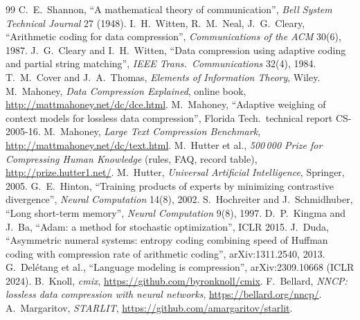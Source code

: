 \documentclass[11pt,a4paper,openany]{book}
\theoremstyle{definition}
\theoremstyle{remark}
\begin{document}
\begin{thebibliography}{99}
 C.~E.~Shannon, ``A mathematical theory of communication'', \emph{Bell System Technical Journal} 27 (1948).
 I.~H.~Witten, R.~M.~Neal, J.~G.~Cleary, ``Arithmetic coding for data compression'', \emph{Communications of the ACM} 30(6), 1987.
 J.~G.~Cleary and I.~H.~Witten, ``Data compression using adaptive coding and partial string matching'', \emph{IEEE Trans.\ Communications} 32(4), 1984.
 T.~M.~Cover and J.~A.~Thomas, \emph{Elements of Information Theory}, Wiley.
 M.~Mahoney, \emph{Data Compression Explained}, online book, \url{http://mattmahoney.net/dc/dce.html}.
 M.~Mahoney, ``Adaptive weighing of context models for lossless data compression'', Florida Tech.\ technical report CS-2005-16.
 M.~Mahoney, \emph{Large Text Compression Benchmark}, \url{http://mattmahoney.net/dc/text.html}.
 M.~Hutter et al., \emph{500\,000\texteuro{} Prize for Compressing Human Knowledge} (rules, FAQ, record table), \url{http://prize.hutter1.net/}.
 M.~Hutter, \emph{Universal Artificial Intelligence}, Springer, 2005.
 G.~E.~Hinton, ``Training products of experts by minimizing contrastive divergence'', \emph{Neural Computation} 14(8), 2002.
 S.~Hochreiter and J.~Schmidhuber, ``Long short-term memory'', \emph{Neural Computation} 9(8), 1997.
 D.~P.~Kingma and J.~Ba, ``Adam: a method for stochastic optimization'', ICLR 2015.
 J.~Duda, ``Asymmetric numeral systems: entropy coding combining speed of Huffman coding with compression rate of arithmetic coding'', arXiv:1311.2540, 2013.
 G.~Del\'etang et al., ``Language modeling is compression'', arXiv:2309.10668 (ICLR 2024).
 B.~Knoll, \emph{cmix}, \url{https://github.com/byronknoll/cmix}.
 F.~Bellard, \emph{NNCP: lossless data compression with neural networks}, \url{https://bellard.org/nncp/}.
 A.~Margaritov, \emph{STARLIT}, \url{https://github.com/amargaritov/starlit}.
\end{thebibliography}
\end{document}
